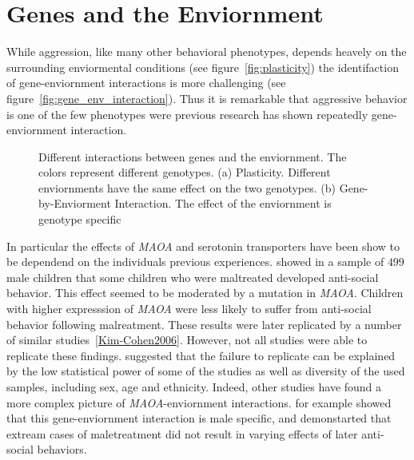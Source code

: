 \section{Genes and the Enviornment}
\label{sec:gene_enviornment_interactions}

While aggression, like many other behavioral phenotypes, depends heavely on the surrounding enviormental conditions (see figure~\ref{fig:plasticity}) the identifaction of gene-enviornment interactions is more challenging (see figure~\ref{fig:gene_env_interaction}).
Thus it is remarkable that aggressive behavior is one of the few phenotypes were previous research has shown repeatedly gene-enviornment interaction.

\begin{figure}[!htp]
	\begin{subfigure}
		
		\caption{Phenotypic Plasticity}
		\label{fig:plasticity}
	\end{subfigure}
	\begin{subfigure}
		
		\caption{Gene-by-Enviorment interaction}
		\label{fig:gene_env_interaction}
	\end{subfigure}
	\label{fig:env_interactions}
	\caption{Different interactions between genes and the enviornment. 
		The colors represent different genotypes. 
		(a) Plasticity. Different enviornments have the same effect on the two genotypes.
		(b) Gene-by-Enviorment Interaction. The effect of the enviornment is genotype specific}
\end{figure}

In particular the effects of \textit{MAOA} and serotonin transporters have been show to be dependend on the individuals previous experiences.
\citet{Caspi2002} showed in a sample of $499$ male children that some children who were maltreated developed anti-social behavior.
This effect seemed to be moderated by a mutation in \textit{MAOA}.
Children with higher expresssion of \textit{MAOA} were less likely to suffer from anti-social behavior following malreatment.
These results were later replicated by a number of similar studies~\ref{Kim-Cohen2006}.
However, not all studies were able to replicate these findings.
\citet{Anholt2012} suggested that the failure to replicate can be explained by the low statistical power of some of the studies as well as diversity of the used samples, including sex, age and ethnicity.
Indeed, other studies have found a more complex picture of \textit{MAOA}-enviornment interactions.
\citet{Huang2004a} for example showed that this gene-enviornment interaction is male specific, and \citet{Weder2009} demonstarted that extream cases of maletreatment did not result in varying effects of later anti-social behaviors.

